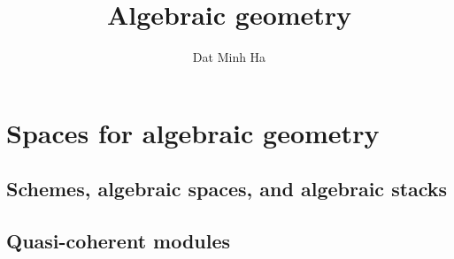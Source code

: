 

\setcounter{chapter}{-1}





    \title{Algebraic geometry}
    
    \author{Dat Minh Ha}
    \maketitle
    
    {
      \hypersetup{} 
      \dominitoc
      \tableofcontents %
    }

    \listoftodos

    
    
    \part{Spaces for algebraic geometry}
        \chapter{Schemes, algebraic spaces, and algebraic stacks}
            \begin{abstract}
                
            \end{abstract}
            
            \minitoc

            

            

            
        
        \chapter{Quasi-coherent modules}
            \begin{abstract}
                
            \end{abstract}
            
            \minitoc

            

